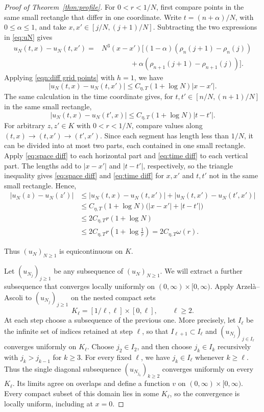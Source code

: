 \documentclass[11pt,letterpaper,reqno]{amsart}
\numberwithin{equation}{section}
\theoremstyle{plain}
\theoremstyle{remark}
\begin{document}
\begin{proof}[Proof of Theorem~\ref{thm:profile}]
For $0<r<1/N$, first compare points in the same small rectangle that differ in one coordinate. Write $t=(n+\alpha)/N$, with $0\le\alpha\le1$, and take $x,x'\in[j/N,(j+1)/N]$. Subtracting the two expressions in \eqref{eq:uN} gives
\[
 \begin{split}
 u_N(t,x)-u_N(t,x')
 ={}&N^3(x-x')\bigl[(1-\alpha)(\rho_n(j+1)-\rho_n(j))\\
 &\qquad\qquad+\alpha(\rho_{n+1}(j+1)-\rho_{n+1}(j))\bigr].
 \end{split}
\]
Applying \eqref{eqn:diff grid points} with $h=1$, we have 
\begin{equation}\label{eq:space diff}
  |u_N(t,x)-u_N(t,x')|\le C_{\eta,T}(1+\log N)|x-x'|.
\end{equation}
The same calculation in the time coordinate gives, for $t,t'\in[n/N,(n+1)/N]$ in the same small rectangle,
\begin{equation}\label{eq:time diff}
 |u_N(t,x)-u_N(t',x)|\le C_{\eta,T}(1+\log N)|t-t'|.
\end{equation}
For arbitrary $z,z'\in K$ with $0<r<1/N$, compare values along $(t,x)\to(t,x')\to(t',x')$. Since each segment has length less than $1/N$, it can be divided into at most two parts, each contained in one small rectangle. Apply \eqref{eq:space diff} to each horizontal part and \eqref{eq:time diff} to each vertical part. The lengths add to $|x-x'|$ and $|t-t'|$, respectively, so the triangle inequality gives \eqref{eq:space diff} and \eqref{eq:time diff} for $x, x'$ and $t,t'$ not in the same small rectangle. Hence,
\[
 \begin{split}
 |u_N(z)-u_N(z')|
 &\le |u_N(t,x)-u_N(t,x')|+|u_N(t,x')-u_N(t',x')|\\
 &\le C_{\eta,T}(1+\log N)\bigl(|x-x'|+|t-t'|\bigr)\\
 &\le 2C_{\eta,T}r(1+\log N)\\
 &\le 2C_{\eta,T}r\left(1+\log\frac1r\right)
 =2C_{\eta,T}\omega(r).
 \end{split}
\]

Thus $(u_N)_{N\ge1}$ is equicontinuous on $K$.

Let $(u_{N_j})_{j\ge1}$ be any subsequence of $(u_N)_{N\ge1}$. We will extract a further subsequence that converges locally uniformly on $(0,\infty)\times[0,\infty)$. Apply Arzel\`a--Ascoli to $(u_{N_j})_{j\ge1}$ on the nested compact sets
\[
 K_\ell=[1/\ell,\ell]\times[0,\ell],\qquad \ell\ge2.
\]
At each step choose a subsequence of the previous one. More precisely, let
$I_\ell$ be the infinite set of indices retained at step $\ell$, so that
$I_{\ell+1}\subset I_\ell$ and $(u_{N_j})_{j\in I_\ell}$ converges uniformly
on $K_\ell$. Choose $j_2\in I_2$, and then choose $j_k\in I_k$ recursively
with $j_k>j_{k-1}$ for $k\ge3$. For every fixed $\ell$, we have $j_k\in I_\ell$ whenever
$k\ge\ell$. Thus the single diagonal subsequence $(u_{N_{j_k}})_{k\ge2}$
converges uniformly on every $K_\ell$. Its limits agree on overlaps and
define a function $v$ on $(0,\infty)\times[0,\infty)$. Every compact subset
of this domain lies in some $K_\ell$, so the convergence is locally uniform,
including at $x=0$.


\end{proof}
\end{document}
